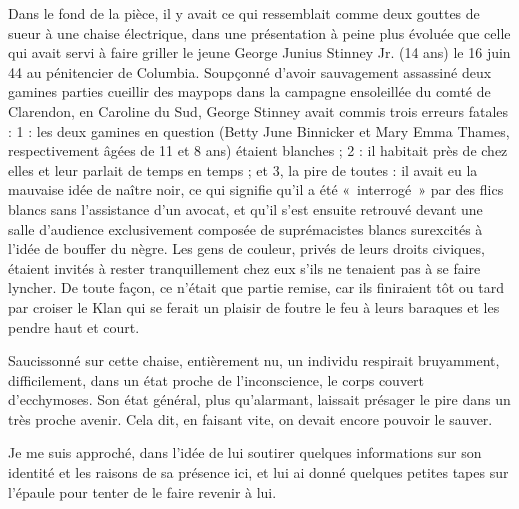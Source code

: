 %
Dans le fond de la pièce, il y avait ce qui ressemblait comme deux gouttes de sueur à une chaise électrique, dans une présentation à peine plus évoluée que celle qui avait servi à faire griller le jeune George Junius Stinney Jr. (14 ans) le 16 juin 44 au pénitencier de Columbia. Soupçonné d’avoir sauvagement assassiné deux gamines parties cueillir des maypops dans la campagne ensoleillée du comté de Clarendon, en Caroline du Sud, George Stinney avait commis trois erreurs fatales : 1 : les deux gamines en question (Betty June Binnicker et Mary Emma Thames, respectivement âgées de 11 et 8 ans) étaient blanches ; 2 : il habitait près de chez elles et leur parlait de temps en temps ; et 3, la pire de toutes : il avait eu la mauvaise idée de naître noir, ce qui signifie qu’il a été «~interrogé~» par des flics blancs sans l’assistance d’un avocat, et qu’il s’est ensuite retrouvé devant une salle d’audience exclusivement composée de suprémacistes blancs surexcités à l’idée de bouffer du nègre. Les gens de couleur, privés de leurs droits civiques, étaient invités à rester tranquillement chez eux s’ils ne tenaient pas à se faire lyncher. De toute façon, ce n’était que partie remise, car ils finiraient tôt ou tard par croiser le Klan qui se ferait un plaisir de foutre le feu à leurs baraques et les pendre haut et court.

Saucissonné sur cette chaise, entièrement nu, un individu respirait bruyamment, difficilement, dans un état proche de l’inconscience, le corps couvert d’ecchymoses. Son état général, plus qu’alarmant, laissait présager le pire dans un très proche avenir. Cela dit, en faisant vite, on devait encore pouvoir le sauver.

Je me suis approché, dans l’idée de lui soutirer quelques informations sur son identité et les raisons de sa présence ici, et lui ai donné quelques petites tapes sur l’épaule pour tenter de le faire revenir à lui.

